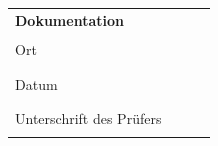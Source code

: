 \documentclass[11pt,a4paper,final,oneside,notitlepage]{report}
\begin{document}
\begin{tabularx}{\textwidth}{|p{}| p{}|p{}|p{}|}
		\hline
		\rule{0pt}{15pt}\textbf{Dokumentation} & &\cellcolor{gray!10} &
		\\[.25ex]
		{\scriptsize Ort } &
		\rule{0.175\textwidth}{0.05mm} &
		\cellcolor{gray!10}\rule{0.175\textwidth}{0.05mm} &
		\rule{0.175\textwidth}{0.05mm}
		\\
		{\scriptsize Datum } &
		\rule{0.175\textwidth}{0.05mm} &
		\cellcolor{gray!10}\rule{0.175\textwidth}{0.05mm} &
		\rule{0.175\textwidth}{0.05mm}
		\\
		{\scriptsize Unterschrift des Prüfers } &
		\rule{0.175\textwidth}{0.05mm} &
		\cellcolor{gray!10}\rule{0.175\textwidth}{0.05mm} &
		\rule{0.175\textwidth}{0.05mm}
		\\
		\hline
	\end{tabularx}

\pagestyle{empty}

\newcommand{\teilnehmer}{Hans Mustermann (Dozent), Stud Ying (Student)} %
\newcommand{\nrb}{1.}                   %
\newcommand{\titel}{Weichendiagnose}    %
\newcommand{\datum}{Montag, 13.10.2014} %
\newcommand{\institut}{Schule}          %

\end{document}
